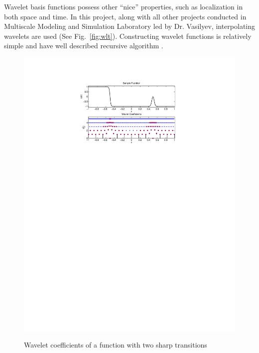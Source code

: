 Wavelet basis functions possess other ``nice'' properties, such as localization in both space and time. In this project, along with all other projects conducted in Multiscale Modeling and Simulation Laboratory led by Dr. Vasilyev, interpolating wavelets are used (See Fig.~\ref{fig:wlt}). Constructing wavelet functions is relatively simple and have well described recursive algorithm \cite{lib:wlt_home}.

\begin{figure}[t]
\centering \includegraphics[scale=1]{fig/wlt_decomp.pdf}\\
\caption{Wavelet coefficients of a function with two sharp transitions \label{fig:wlt_decomp}}
\end{figure}
